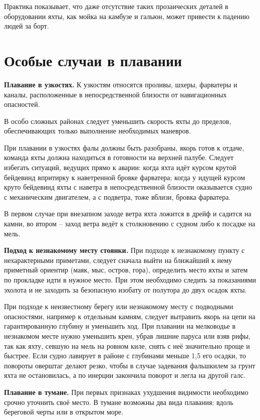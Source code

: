 Практика показывает, что даже отсутствие таких прозаических деталей в
оборудовании яхты, как мойка на камбузе и гальюн, может привести к
падению людей за борт.

\section{Особые случаи в плавании}

\textbf{Плавание в узкостях.} К узкостям относятся
проливы, шхеры, фарватеры и каналы, расположенные в непосредственной
близости от навигационных опасностей.

В особо сложных районах следует уменьшить скорость яхты до пределов,
обеспечивающих только выполнение необходимых маневров.

При плавании в узкостях фалы должны быть разобраны, якорь готов к
отдаче, команда яхты должна находиться в готовности на верхней
палубе. Следует избегать ситуаций, ведущих прямо к аварии: когда яхта
идёт курсом крутой бейдевинд впритирку к наветренной бровке фарватера;
когда у идущей курсом круто бейдевинд яхты с наветра в
непосредственной близости оказывается судно с механическим двигателем,
а с подветра, тоже вблизи, бровка фарватера.

В первом случае при внезапном заходе ветра яхта ложится в дрейф и
садится на камни, во втором \--- заход ветра ведёт к столкновению с
судном либо к посадке на мель.

\textbf{Подход к незнакомому месту стоянки.} При подходе к незнакомому
пункту с нехарактерными приметами, следует сначала выйти на ближайший
к нему приметный ориентир (маяк, мыс, остров, гора), определить место
яхты и затем по прокладке идти в нужное место. При этом необходимо
следить за показаниями эхолота и не заходить за безопасную изобату от
полутора до двух осадок яхты.

При подходе к неизвестному берегу или незнакомому месту с подводными
опасностями, например к отдельным камням, следует вытравить якорь на
цепи на гарантированную глубину и уменьшить ход. При плавании на
мелководье в незнакомом месте нужно уменьшить крен, убрав лишние
паруса или взяв рифы, так как яхту, севшую на мель на ровном киле,
снять с неё значительно проще и быстрее. Если судно лавирует в районе
с глубинами меньше 1,5 его осадки, то повороты оверштаг делают резко,
чтобы в случае задевания фальшкилем за грунт яхта не остановилась, а
по инерции закончила поворот и легла на другой галс.

\textbf{Плавание в тумане.} При первых признаках ухудшения видимости
необходимо срочно уточнить своё место. В тумане возможны два вида
плавания: вдоль береговой черты или в открытом море.

